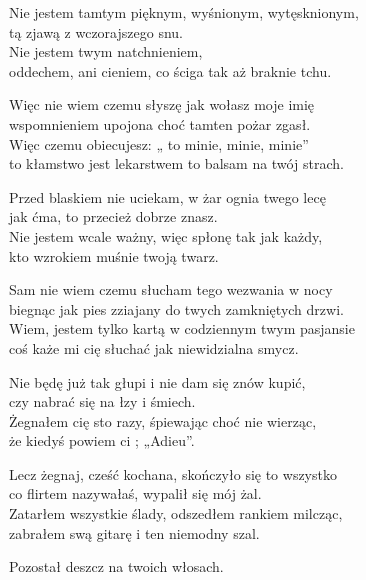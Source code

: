 \begin{text}
    Nie jestem tamtym pięknym, wyśnionym, wytęsknionym,\\
    tą zjawą z wczorajszego snu.\\
    Nie jestem twym natchnieniem,\\
    oddechem, ani cieniem, co ściga tak aż braknie tchu.

    Więc nie wiem czemu słyszę jak wołasz moje imię\\
    wspomnieniem upojona choć tamten pożar zgasł.\\
    Więc czemu obiecujesz: „ to minie, minie, minie”\\
    to kłamstwo jest lekarstwem to balsam na twój strach.

    Przed blaskiem nie uciekam, w żar ognia twego lecę\\
    jak ćma, to przecież dobrze znasz.\\
    Nie jestem wcale ważny, więc spłonę tak jak każdy,\\
    kto wzrokiem muśnie twoją twarz.

    Sam nie wiem czemu słucham tego wezwania w nocy\\
    biegnąc jak pies zziajany do twych zamkniętych drzwi.\\
    Wiem, jestem tylko kartą w codziennym twym pasjansie\\
    coś każe mi cię słuchać jak niewidzialna smycz.

    Nie będę już tak głupi i nie dam się znów kupić,\\
    czy nabrać się na łzy i śmiech.\\
    Żegnałem cię sto razy, śpiewając choć nie wierząc,\\
    że kiedyś powiem ci ; „Adieu”.

    Lecz żegnaj, cześć kochana, skończyło się to wszystko\\
    co flirtem nazywałaś, wypalił się mój żal.\\
    Zatarłem wszystkie ślady, odszedłem rankiem milcząc,\\
    zabrałem swą gitarę i ten niemodny szal.

    Pozostał deszcz na twoich włosach.
\end{text}
\begin{chord}

\end{chord}
